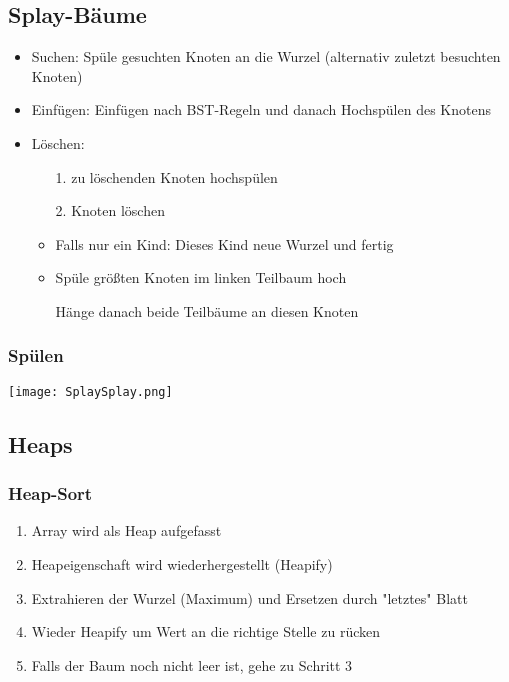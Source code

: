 \subsection*{Splay-Bäume}
\begin{itemize}
    \item Suchen: Spüle gesuchten Knoten an die Wurzel (alternativ zuletzt besuchten Knoten)
    \item Einfügen: Einfügen nach BST-Regeln und danach Hochspülen des Knotens
    \item Löschen:
        \begin{itemize}
            \item[1.] zu löschenden Knoten hochspülen
            \item[2.] Knoten löschen
            \item Falls nur ein Kind: Dieses Kind neue Wurzel und fertig
            \item {}  Spüle größten Knoten im linken Teilbaum hoch
            \item[] {\makebox[3cm][l]{}} Hänge danach beide Teilbäume an diesen Knoten
        \end{itemize}
\end{itemize}

\subsubsection*{Spülen}
\centerline{\texttt{[image: SplaySplay.png]}}

\subsection*{Heaps}
\subsubsection*{Heap-Sort}
    \begin{enumerate}
        \item Array wird als Heap aufgefasst
        \item Heapeigenschaft wird wiederhergestellt (Heapify)
        \item Extrahieren der Wurzel (Maximum) und Ersetzen durch \string"letztes\string" Blatt
        \item Wieder Heapify um Wert an die richtige Stelle zu rücken
        \item Falls der Baum noch nicht leer ist, gehe zu Schritt 3
    \end{enumerate}

